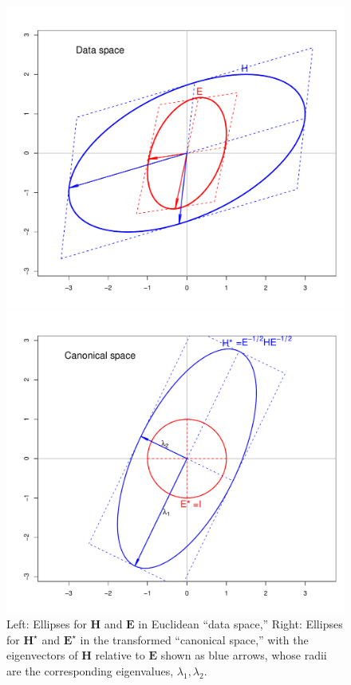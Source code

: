 \documentclass[11pt]{article}%
\newcommand{\TODO}[1]{\begin{quotation}\color{blue}\textbf{ToDo}: #1\end{quotation}}
\newcommand*{\mat}[1]{\ensuremath{\bm{#1}}}
\begin{document}
\begin{figure}[htb]
  \begin{minipage}[c]{.495\textwidth}
   \includegraphics[width=1\linewidth,clip]{fig/ellipse-geneig1}
   \end{minipage}%
  \hfill
  \begin{minipage}[c]{.495\textwidth}
   \includegraphics[width=1\linewidth,clip]{fig/ellipse-geneig2}
  \end{minipage}
  \caption{Left: Ellipses for \mat{H} and \mat{E} in Euclidean ``data space,''
   Right: Ellipses for $\mat{H}^\star$ and $\mat{E}^\star$ in the transformed ``canonical space,''
   with the eigenvectors of \mat{H} relative to \mat{E} shown as blue arrows, whose radii
   are the corresponding eigenvalues, $\lambda_1, \lambda_2$. }%
  \label{fig:ellipse-geneig}
\end{figure}
\end{document}
